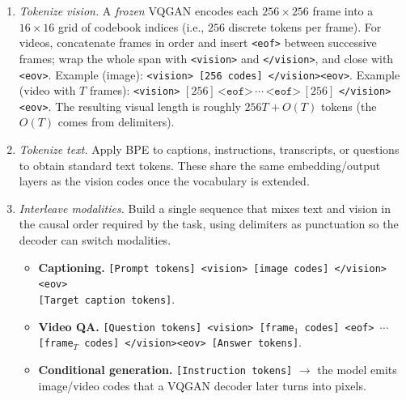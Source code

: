\begin{enrichment}
\begin{enrichment}
\begin{enumerate}
            \noindent\textbf{Concrete example.} Suppose \(N_{\max}{=}64{,}000\), \(L_{\text{text}}{=}1{,}500\), \(L_{\text{misc}}{=}500\), so \(B_{\text{vis}}{=}62{,}000\). With \(c_{\text{frame}}\!\approx\!257\), we get \(T_{\max}{=}\lfloor 62{,}000/257 \rfloor{=}241\) frames. For a \(120\)s clip at \(f_{\text{raw}}{=}4\) FPS (\(T_{\text{raw}}{=}480\)), set \(f_{\text{target}}{=}\lfloor 241/120 \rfloor{=}2\) FPS and sample \(\approx 240\) frames uniformly. If the clip were \(1{,}200\)s long, even \(f_{\text{target}}{=}1\) FPS would exceed the budget; in that case, take a contiguous window of \(T_{\max}{=}241\) frames (about four minutes) this step, and a different window next time.
            
            \item \textit{Tokenize vision.} A \emph{frozen} VQGAN encodes each \(256{\times}256\) frame into a \(16{\times}16\) grid of codebook indices (i.e., \(256\) discrete tokens per frame). For videos, concatenate frames in order and insert \texttt{<eof>} between successive frames; wrap the whole span with \texttt{<vision>} and \texttt{</vision>}, and close with \texttt{<eov>}. Example (image): \texttt{<vision> [256 codes] </vision><eov>}. Example (video with \(T\) frames): \texttt{<vision>} \([256]\,\texttt{<eof>}\,\cdots\,\texttt{<eof>}\,[256]\) \texttt{</vision><eov>}. The resulting visual length is roughly \(256T + O(T)\) tokens (the \(O(T)\) comes from delimiters).
            
            \item \textit{Tokenize text.} Apply BPE to captions, instructions, transcripts, or questions to obtain standard text tokens. These share the same embedding/output layers as the vision codes once the vocabulary is extended.
            
            \item \textit{Interleave modalities.} Build a single sequence that mixes text and vision in the causal order required by the task, using delimiters as punctuation so the decoder can switch modalities.
            \begin{itemize}
                \item \textbf{Captioning.} \texttt{[Prompt tokens] <vision> [image codes] </vision><eov>} \\ \texttt{[Target caption tokens]}. 
                \item \textbf{Video QA.} \texttt{[Question tokens] <vision> [frame\(_1\) codes] <eof> \(\cdots\) [frame\(_T\) codes] </vision><eov> [Answer tokens]}. 
                \item \textbf{Conditional generation.} \texttt{[Instruction tokens]} \(\rightarrow\) the model emits image/video codes that a VQGAN decoder later turns into pixels.
            \end{itemize}
            

\end{enumerate}
\end{enrichment}
\end{enrichment}
